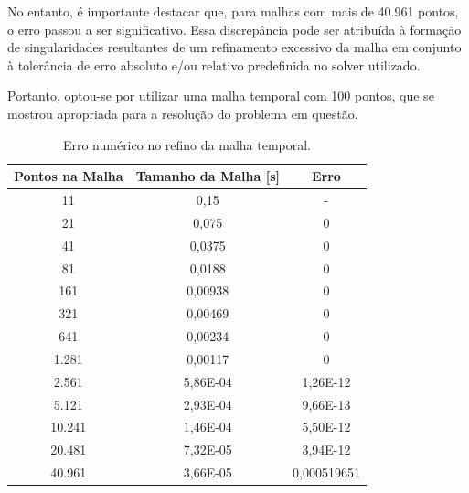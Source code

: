 No entanto, é importante destacar que, para malhas com mais de 40.961 pontos, o erro passou a ser significativo. Essa discrepância pode ser atribuída à formação de singularidades resultantes de um refinamento excessivo da malha em conjunto à tolerância de erro absoluto e/ou relativo predefinida no solver utilizado.

Portanto, optou-se por utilizar uma malha temporal com 100 pontos, que se mostrou apropriada para a resolução do problema em questão.

\begin{table}[H]
    \centering
    \caption{Erro numérico no refino da malha temporal.}
    \begin{tabular}{ccc}
        \textbf{Pontos na Malha} & \textbf{Tamanho da Malha {[}s{]}} & \textbf{Erro} \\ \hline
        11                       & 0,15                                          & -             \\
        21                       & 0,075                                         & 0             \\
        41                       & 0,0375                                        & 0             \\
        81                       & 0,0188                                        & 0             \\
        161                      & 0,00938                                       & 0             \\
        321                      & 0,00469                                       & 0             \\
        641                      & 0,00234                                       & 0             \\
        1.281                     & 0,00117                                       & 0             \\
        2.561                     & 5,86E-04                                      & 1,26E-12      \\
        5.121                     & 2,93E-04                                      & 9,66E-13      \\
        10.241                    & 1,46E-04                                      & 5,50E-12      \\
        20.481                    & 7,32E-05                                      & 3,94E-12      \\
        40.961                    & 3,66E-05                                      & 0,000519651  
    \end{tabular}
    \label{tab:error_in_the_temporal_mesh}
\end{table}


